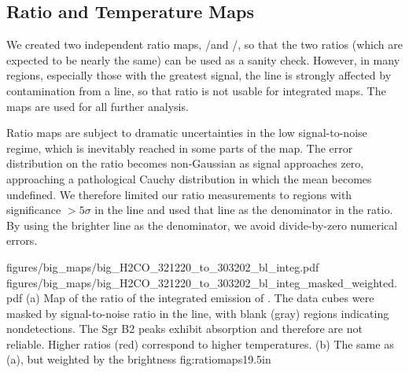 \subsection{Ratio and Temperature Maps}
\label{sec:h2co}
We created two independent ratio maps, \threetwotwo/\threeohthree and
\threetwoone/\threeohthree, so that the two ratios (which are expected to be
nearly the same) can be used as a sanity check.  However, in many regions,
especially those with the greatest signal, the \threetwotwo line is strongly
affected by contamination from a \methanol line, so that ratio is not
usable for integrated maps.  The \Rone maps are used for all further analysis.

Ratio maps are subject to dramatic uncertainties in the low signal-to-noise
regime, which is inevitably reached in some parts of the map.  The error
distribution on the ratio becomes non-Gaussian as signal approaches zero,
approaching a pathological Cauchy distribution in which the mean becomes
undefined.
We therefore limited our ratio measurements to regions with significance
$>5\sigma$ in the \threeohthree line and used that line as the denominator
in the ratio.  By using the brighter line as the denominator, we avoid
divide-by-zero numerical errors.


\RotFigureTwoAA
{figures/big_maps/big_H2CO_321220_to_303202_bl_integ.pdf}
{figures/big_maps/big_H2CO_321220_to_303202_bl_integ_masked_weighted.pdf}
{(a) Map of the ratio of the integrated emission of
\Rone.  The data cubes were masked by
signal-to-noise ratio in the \threeohthree line, with blank (gray) regions
indicating nondetections.  The Sgr B2 peaks exhibit \formaldehyde
absorption and therefore are not reliable.  Higher ratios (red) correspond
to higher temperatures.
\newline
(b) The same as (a), but weighted by the \threeohthree brightness
\newline
}
{fig:ratiomaps}{1}{9.5in}

